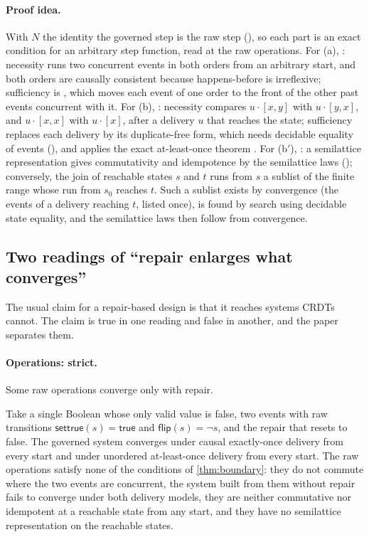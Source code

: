 \paragraph{Proof idea.}
With $N$ the identity the governed step is the raw step (), so each part is an exact
condition for an arbitrary step function, read at the raw operations. For (a),
: necessity runs two concurrent events in both orders from an arbitrary
start, and both orders are causally consistent because happens-before is irreflexive; sufficiency is
, which moves each event of one order to the front of the other past events
concurrent with it. For (b), : necessity compares $u \cdot [x, y]$ with
$u \cdot [y, x]$, and $u \cdot [x, x]$ with $u \cdot [x]$, after a delivery $u$ that reaches the state;
sufficiency replaces each delivery by its duplicate-free form, which needs decidable equality of
events (), and applies the exact at-least-once theorem . For
(b$'$), : a semilattice representation gives commutativity and idempotence by
the semilattice laws (); conversely, the join of reachable states $s$ and $t$ runs
from $s$ a sublist of the finite range whose run from $s_0$ reaches $t$. Such a sublist exists by
convergence (the events of a delivery reaching $t$, listed once), is found by search using decidable
state equality, and the semilattice laws then follow from convergence.

\subsection{Two readings of ``repair enlarges what converges''}\label{sec:crdt-readings}

The usual claim for a repair-based design is that it reaches systems CRDTs cannot. The claim is true
in one reading and false in another, and the paper separates them.

\paragraph{Operations: strict.}
Some raw operations converge only with repair.

\begin{proposition}\label{prop:witness}
Take a single Boolean whose only valid value is \textsf{false}, two events with raw transitions
$\mathsf{settrue}(s) = \textsf{true}$ and $\mathsf{flip}(s) = \neg s$, and the repair that resets to
\textsf{false}. The governed system converges under causal exactly-once delivery from every start
and under unordered at-least-once delivery from every start. The raw operations satisfy none of the
conditions of \cref{thm:boundary}: they do not commute where the two events are concurrent, the
system built from them without repair fails to converge under both delivery models, they are neither
commutative nor idempotent at a reachable state from any start, and they have no semilattice
representation on the reachable states.
\end{proposition}

